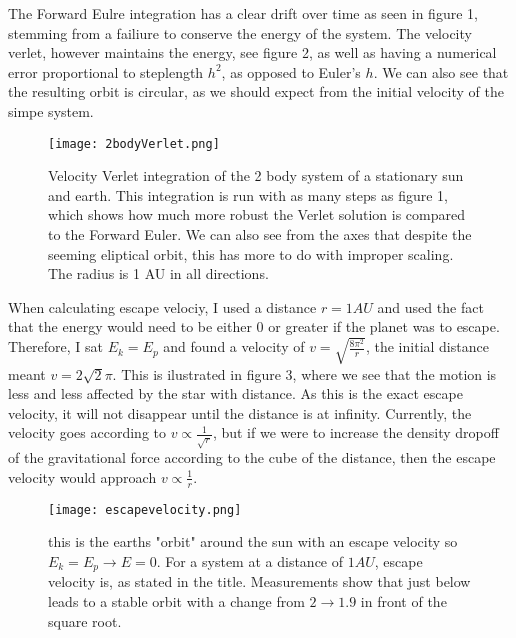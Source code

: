 \documentclass[10pt, twocolumn]{revtex4-1}
\begin{document}
The Forward Eulre integration has a clear drift over time as seen in figure 1, stemming from a failiure to conserve the energy of the system. 
The velocity verlet, however maintains the energy, see figure 2, as well as having a numerical error proportional to steplength $h^2$, as 
opposed to Euler's $h$. We can also see that the resulting orbit is circular, as we should expect from the initial velocity of the simpe system. 


\begin{figure}[hbtp]
    \texttt{[image: 2bodyVerlet.png]}
    \caption{Velocity Verlet integration of the 2 body system of a stationary sun and earth.
        This integration is run with as many steps as figure 1, which shows how much more robust
        the Verlet solution is compared to the Forward Euler. We can also see from the axes that 
        despite the seeming eliptical orbit, this has more to do with improper scaling. The radius
        is 1 AU in all directions. } 
    \label{}
\end{figure}

When calculating escape velociy, I used a distance $r= 1AU$ and used the fact that the energy would need to be either $0$
or greater if the planet was to escape. Therefore, I sat $E_k = E_p$ and found a velocity of $v = \sqrt{\frac{8\pi^2}{r}}$,
the initial distance meant $v = 2\sqrt{2}\pi$. This is ilustrated in figure 3, where we see that the motion is less and 
less affected by the star with distance. As this is the exact escape velocity, it will not disappear until the distance is at 
infinity. Currently, the velocity goes according to $v \propto \frac{1}{\sqrt{r}}$, but if we were to increase the density
dropoff of the gravitational force according to the cube of the distance, then the escape velocity would approach 
$v \propto \frac{1}{r}$.
\begin{figure}[hbtp]
    \texttt{[image: escapevelocity.png]}
    \caption{this is the earths "orbit" around the sun with an escape velocity so $E_k = E_p \rightarrow E=0$.
        For a system at a distance of $1 AU$, escape velocity is, as stated in the title. Measurements show that 
        just below leads to a stable orbit with a change from $2 \rightarrow 1.9$ in front of the square root.} 
    \label{}
\end{figure}
\end{document}
